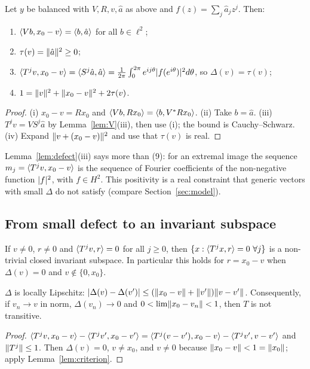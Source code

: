 \begin{lemma}\label{lem:defect}\stproved{}
Let $y$ be balanced with $V,R,v,\hat a$ as above and $f(z)=\sum_j\hat a_jz^j$. Then:
\begin{enumerate}[label=(\roman*)]
\item $\langle Vb,x_0-v\rangle=\langle b,\hat a\rangle$ for all $b\in\ell^2$;
\item $\tau(v)=\lVert \hat a\rVert^2\ge0$;
\item $\langle T^jv,x_0-v\rangle=\langle S^j\hat a,\hat a\rangle
=\frac1{2\pi}\int_0^{2\pi}e^{ij\theta}\lvert f(e^{i\theta})\rvert^2d\theta$, so
$\Delta(v)=\tau(v)$;
\item $1=\lVert v\rVert^2+\lVert x_0-v\rVert^2+2\tau(v)$.
\end{enumerate}
\end{lemma}
\begin{proof}
(i) $x_0-v=Rx_0$ and $\langle Vb,Rx_0\rangle=\langle b,V^*Rx_0\rangle$. (ii) Take $b=\hat a$. (iii) $T^jv=VS^j\hat a$
by Lemma~\ref{lem:V}(iii), then use (i); the bound is Cauchy--Schwarz. (iv) Expand
$\lVert v+(x_0-v)\rVert^2$ and use that $\tau(v)$ is real.
\end{proof}

\begin{remark}\label{rem:posdef}
Lemma~\ref{lem:defect}(iii) says more than \paper{} (9): for an extremal image the sequence
$m_j=\langle T^jv,x_0-v\rangle$ is the sequence of Fourier coefficients of the non-negative function
$\lvert f\rvert^2$, with $f\in H^2$. This positivity is a real constraint that generic vectors with small
$\Delta$ do not satisfy (compare Section~\ref{sec:model}).
\end{remark}

\subsection{From small defect to an invariant subspace}

\begin{lemma}[Criterion]\label{lem:criterion}
\stproved{} 
If $v\ne0$, $r\ne0$ and $\langle T^jv,r\rangle=0$ for all $j\ge0$, then
$\{x:\langle T^jx,r\rangle=0\ \forall j\}$ is a non-trivial closed invariant subspace. In particular this
holds for $r=x_0-v$ when $\Delta(v)=0$ and $v\notin\{0,x_0\}$.
\end{lemma}

\begin{lemma}[Limits]\label{lem:limit}\stproved{}
$\Delta$ is locally Lipschitz: $\lvert \Delta(v)-\Delta(v')\rvert\le(\lVert x_0-v\rVert+\lVert v'\rVert)\lVert v-v'\rVert$.
Consequently, if $v_n\to v$ in norm, $\Delta(v_n)\to0$ and
$0<\lim\lVert x_0-v_n\rVert<1$, then $T$ is not transitive.
\end{lemma}
\begin{proof}
$\langle T^jv,x_0-v\rangle-\langle T^jv',x_0-v'\rangle=\langle T^j(v-v'),x_0-v\rangle-\langle T^jv',v-v'\rangle$ and $\lVert T^j\rVert\le1$.
Then $\Delta(v)=0$, $v\ne x_0$, and $v\ne0$ because $\lVert x_0-v\rVert<1=\lVert x_0\rVert$; apply
Lemma~\ref{lem:criterion}.
\end{proof}

